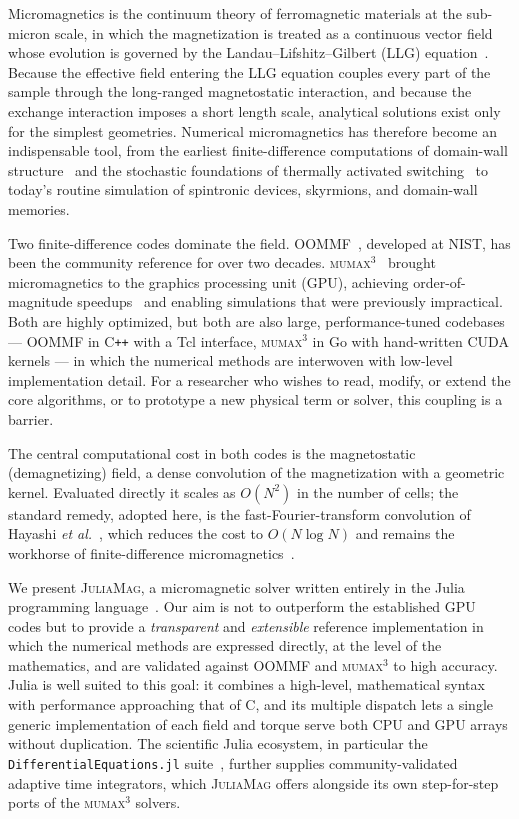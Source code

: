 \documentclass{article}      %
\newcommand{\JuliaMag}{\textsc{JuliaMag}}
\newcommand{\mumax}{\textsc{mumax}$^3$}
\newcommand{\oommf}{\textsc{OOMMF}}
\begin{document}
Micromagnetics is the continuum theory of ferromagnetic materials at the
sub-micron scale, in which the magnetization is treated as a continuous
vector field whose evolution is governed by the Landau--Lifshitz--Gilbert (LLG)
equation~\cite{miltat2007,abert2019}. Because the effective field entering the
LLG equation couples every part of the sample through the long-ranged
magnetostatic interaction, and because the exchange interaction imposes a short
length scale, analytical solutions exist only for the simplest geometries.
Numerical micromagnetics has therefore become an indispensable tool, from the
earliest finite-difference computations of domain-wall structure~\cite{labonte1969}
and the stochastic foundations of thermally activated
switching~\cite{brown1963} to today's routine simulation of spintronic devices,
skyrmions, and domain-wall memories.

Two finite-difference codes dominate the field. \oommf~\cite{oommf}, developed at
NIST, has been the community reference for over two decades. \mumax~\cite{mumax3}
brought micromagnetics to the graphics processing unit (GPU), achieving order-of-
magnitude speedups~\cite{lopezdiaz2012} and enabling simulations that were
previously impractical. Both are highly optimized, but both are also large,
performance-tuned codebases --- \oommf{} in C\texttt{++} with a Tcl interface,
\mumax{} in Go with hand-written CUDA kernels --- in which the numerical methods
are interwoven with low-level implementation detail. For a researcher who wishes
to read, modify, or extend the core algorithms, or to prototype a new physical
term or solver, this coupling is a barrier.

The central computational cost in both codes is the magnetostatic
(demagnetizing) field, a dense convolution of the magnetization with a geometric
kernel. Evaluated directly it scales as $O(N^2)$ in the number of cells; the
standard remedy, adopted here, is the fast-Fourier-transform convolution of
Hayashi \textit{et al.}~\cite{hayashi1996}, which reduces the cost to
$O(N\log N)$ and remains the workhorse of finite-difference
micromagnetics~\cite{lepadatu2019}.

We present \JuliaMag, a micromagnetic solver written entirely in the Julia
programming language~\cite{julia}. Our aim is not to outperform the established
GPU codes but to provide a \emph{transparent} and \emph{extensible} reference
implementation in which the numerical methods are expressed directly, at the
level of the mathematics, and are validated against \oommf{} and \mumax{} to high
accuracy. Julia is well suited to this goal: it combines a high-level,
mathematical syntax with performance approaching that of C, and its multiple
dispatch lets a single generic implementation of each field and torque serve both
CPU and GPU arrays without duplication. The scientific Julia ecosystem, in
particular the \texttt{DifferentialEquations.jl} suite~\cite{diffeq}, further
supplies community-validated adaptive time integrators, which \JuliaMag{} offers
alongside its own step-for-step ports of the \mumax{} solvers.
\end{document}
